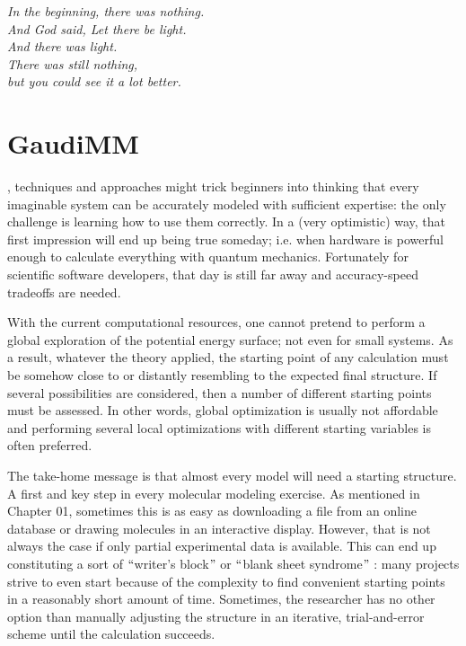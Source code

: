 \begin{savequote}[0.6\textwidth]
	\itshape In the beginning, there was nothing. \\
	\itshape And God said, Let there be light. \\
	\itshape And there was light. \\
	\itshape There was still nothing, \\
	\itshape but you could see it a lot better.
\end{savequote}

\chapter{GaudiMM}
\label{chap:04}


, techniques and approaches might trick beginners into thinking that every imaginable system can be accurately modeled with sufficient expertise: the only challenge is learning how to use them correctly. In a (very optimistic) way, that first impression will end up being true someday; i.e. when hardware is powerful enough to calculate everything with quantum mechanics. Fortunately for scientific software developers, that day is still far away and accuracy-speed tradeoffs are needed.

With the current computational resources, one cannot pretend to perform a global exploration of the potential energy surface; not even for small systems. As a result, whatever the theory applied, the starting point of any calculation must be somehow close to or distantly resembling to the expected final structure. If several possibilities are considered, then a number of different starting points must be assessed. In other words, global optimization is usually not affordable and performing several local optimizations with different starting variables is often preferred.

The take-home message is that almost every model will need a starting structure. A first and key step in every molecular modeling exercise. As mentioned in Chapter 01, sometimes this is as easy as downloading a file from an online database or drawing molecules in an interactive display. However, that is not always the case if only partial experimental data is available. This can end up constituting a sort of $``$writer’s block$"$  or $``$blank sheet syndrome$"$ : many projects strive to even start because of the complexity to find convenient starting points in a reasonably short amount of time. Sometimes, the researcher has no other option than manually adjusting the structure in an iterative, trial-and-error scheme until the calculation succeeds.

